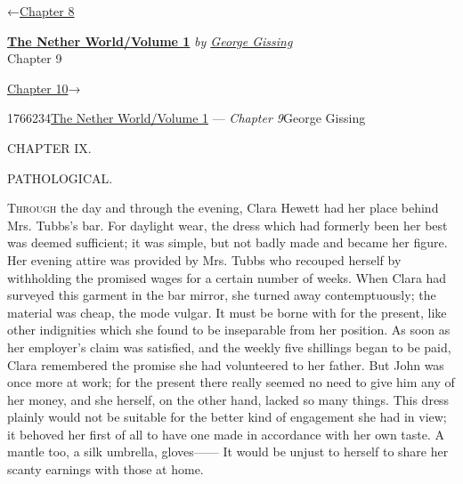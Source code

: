 \hypertarget{headerContainer}{}
\hypertarget{navigationHeader}{}
\protect\hypertarget{headerprevious}{}{←\href{/wiki/The_Nether_World/Volume_1/Chapter_8}{Chapter
8}}

\textbf{\protect\hypertarget{header_title_text}{}{\href{/w/index.php?title=The_Nether_World/Volume_1\&action=edit\&redlink=1}{The
Nether World/Volume 1}}} \emph{by
\href{/wiki/Author:George_Gissing}{\protect\hypertarget{header_author_text}{}{{George
Gissing}}}}\\
\protect\hypertarget{header_section_text}{}{Chapter 9}

\protect\hypertarget{headernext}{}{\href{/wiki/The_Nether_World/Volume_1/Chapter_10}{Chapter
10}→}

\hypertarget{navigationNotes}{}

\hypertarget{ws-data}{}
\protect\hypertarget{ws-article-id}{}{1766234}\protect\hypertarget{ws-title}{}{\href{/w/index.php?title=The_Nether_World/Volume_1\&action=edit\&redlink=1}{The
Nether World/Volume 1} --- \emph{Chapter
9}}\protect\hypertarget{ws-author}{}{George Gissing}

{\protect\hypertarget{190}{}{}}

{CHAPTER IX.}

PATHOLOGICAL.

\textsc{Through} the day and through the evening, Clara Hewett had her
place behind Mrs. Tubbs's bar. For daylight wear, the dress which had
formerly been her best was deemed sufficient; it was simple, but not
badly made and became her figure. Her evening attire was provided by
Mrs. Tubbs who recouped herself by withholding the promised wages for a
certain number of weeks. When Clara had surveyed this garment in the bar
mirror, she turned away contemptuously; the material was cheap, the mode
vulgar. It must be borne with for the present, like other indignities
which she found to be inseparable from her position. As soon as her
employer's claim was satisfied, and the weekly five shillings began to
be paid, Clara remembered {\protect\hypertarget{191}{}{}}the promise she
had volunteered to her father. But John was once more at work; for the
present there really seemed no need to give him any of her money, and
she herself, on the other hand, lacked so many things. This dress
plainly would not be suitable for the better kind of engagement she had
in view; it behoved her first of all to have one made in accordance with
her own taste. A mantle too, a silk umbrella, gloves{{------}} It would
be unjust to herself to share her scanty earnings with those at home.

